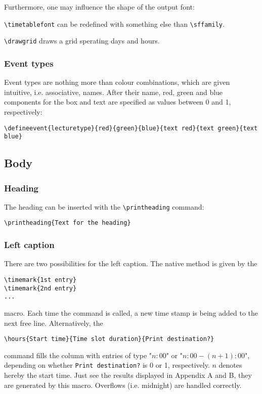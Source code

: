\documentclass[a4paper,10pt]{article}
\begin{document}
Furthermore, one may influence the shape of the output font:
\begin{description}
\item \lstinline!\timetablefont! can be redefined with something else than \lstinline!\sffamily!.
\item \lstinline!\drawgrid! draws a grid sperating days and hours.
\end{description}

\subsubsection{Event types}\label{defineevent}
Event types are nothing more than colour combinations, which are given intuitive, i.e. associative, names. After their name, red, green and blue components for the box and text are specified as values between 0 and 1, respectively:
\begin{lstlisting}
\defineevent{lecturetype}{red}{green}{blue}{text red}{text green}{text blue}
\end{lstlisting}

\subsection{Body}
\subsubsection{Heading}
The heading can be inserted with the \lstinline{\printheading} command:
\begin{lstlisting}
\printheading{Text for the heading}
\end{lstlisting}

\subsubsection{Left caption}
There are two possibilities for the left caption. The native method is given by the
\begin{lstlisting}
\timemark{1st entry}
\timemark{2nd entry}
...
\end{lstlisting}
macro. Each time the command is called, a new time stamp is being added to the next free line. Alternatively, the
\begin{lstlisting}
\hours{Start time}{Time slot duration}{Print destination?}
\end{lstlisting}
command fills the column with entries of type "$n:00$" or "$n:00 - (n+1):00$", depending on whether \lstinline{Print destination?} is 0 or 1, respectively. $n$ denotes hereby the start time. Just see the results displayed in Appendix A and B, they are generated by this macro. Overflows (i.e. midnight) are handled correctly.
\end{document}

